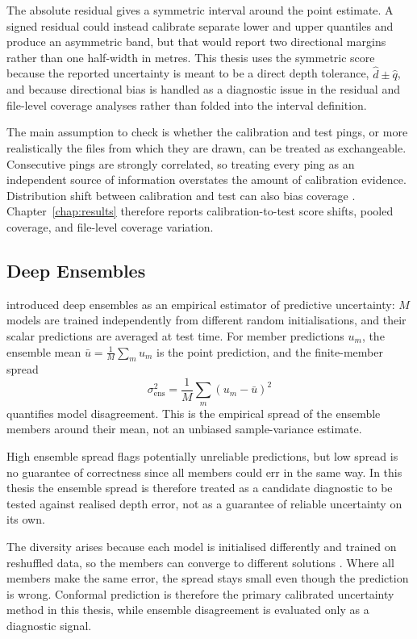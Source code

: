 The absolute residual gives a symmetric interval around the point estimate. A signed residual could instead calibrate separate lower and upper quantiles and produce an asymmetric band, but that would report two directional margins rather than one half-width in metres. This thesis uses the symmetric score because the reported uncertainty is meant to be a direct depth tolerance, $\hat d \pm \hat q$, and because directional bias is handled as a diagnostic issue in the residual and file-level coverage analyses rather than folded into the interval definition.

The main assumption to check is whether the calibration and test pings, or more realistically the files from which they are drawn, can be treated as exchangeable. Consecutive pings are strongly correlated, so treating every ping as an independent source of information overstates the amount of calibration evidence. Distribution shift between calibration and test can also bias coverage \cite{barber_conformal_2023,tibshirani_conformal_2019}. Chapter~\ref{chap:results} therefore reports calibration-to-test score shifts, pooled coverage, and file-level coverage variation.

\subsection{Deep Ensembles}

\textcite{lakshminarayanan_simple_2017} introduced deep ensembles as an empirical estimator of predictive uncertainty: $M$ models are trained independently from different random initialisations, and their scalar predictions are averaged at test time. For member predictions $u_m$, the ensemble mean $\bar{u} = \tfrac{1}{M} \sum_m u_m$ is the point prediction, and the finite-member spread
\begin{equation}
    \sigma^2_{\mathrm{ens}} = \frac{1}{M} \sum_m (u_m - \bar{u})^2
\end{equation}
quantifies model disagreement. This is the empirical spread of the ensemble members around their mean, not an unbiased sample-variance estimate.

High ensemble spread flags potentially unreliable predictions, but low spread is no guarantee of correctness since all members could err in the same way. In this thesis the ensemble spread is therefore treated as a candidate diagnostic to be tested against realised depth error, not as a guarantee of reliable uncertainty on its own.

The diversity arises because each model is initialised differently and trained on reshuffled data, so the members can converge to different solutions \cite{lakshminarayanan_simple_2017}. Where all members make the same error, the spread stays small even though the prediction is wrong. Conformal prediction is therefore the primary calibrated uncertainty method in this thesis, while ensemble disagreement is evaluated only as a diagnostic signal.
